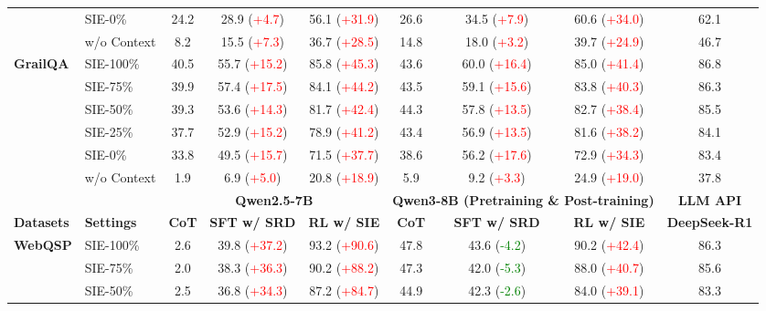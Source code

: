 \documentclass{article} %
\begin{document}
\begin{table}[t]
{\begin{tabular}{l|l|ccc|ccc|c}
& SIE-0\% & 24.2 & 28.9 (\textcolor{red}{+4.7}) & 56.1 (\textcolor{red}{+31.9}) & 26.6 & 34.5 (\textcolor{red}{+7.9}) & 60.6 (\textcolor{red}{+34.0}) & 62.1 \\
& w/o Context & 8.2 & 15.5 (\textcolor{red}{+7.3}) & 36.7 (\textcolor{red}{+28.5}) & 14.8 & 18.0 (\textcolor{red}{+3.2}) & 39.7 (\textcolor{red}{+24.9}) & 46.7 \\
\hline
\multirow{6}{*}{\textbf{GrailQA}} 
& SIE-100\% & 40.5 & 55.7 (\textcolor{red}{+15.2}) & 85.8 (\textcolor{red}{+45.3}) & 43.6 & 60.0 (\textcolor{red}{+16.4}) & 85.0 (\textcolor{red}{+41.4}) & 86.8 \\
& SIE-75\% & 39.9 & 57.4 (\textcolor{red}{+17.5}) & 84.1 (\textcolor{red}{+44.2}) & 43.5 & 59.1 (\textcolor{red}{+15.6}) & 83.8 (\textcolor{red}{+40.3}) & 86.3 \\
& SIE-50\% & 39.3 & 53.6 (\textcolor{red}{+14.3}) & 81.7 (\textcolor{red}{+42.4}) & 44.3 & 57.8 (\textcolor{red}{+13.5}) & 82.7 (\textcolor{red}{+38.4}) & 85.5 \\
& SIE-25\% & 37.7 & 52.9 (\textcolor{red}{+15.2}) & 78.9 (\textcolor{red}{+41.2}) & 43.4 & 56.9 (\textcolor{red}{+13.5}) & 81.6 (\textcolor{red}{+38.2}) & 84.1 \\
& SIE-0\% & 33.8 & 49.5 (\textcolor{red}{+15.7}) & 71.5 (\textcolor{red}{+37.7}) & 38.6 & 56.2 (\textcolor{red}{+17.6}) & 72.9 (\textcolor{red}{+34.3}) & 83.4 \\
& w/o Context & 1.9 & 6.9 (\textcolor{red}{+5.0}) & 20.8 (\textcolor{red}{+18.9}) & 5.9 & 9.2 (\textcolor{red}{+3.3}) & 24.9 (\textcolor{red}{+19.0}) & 37.8 \\
\hline
\hline
\multicolumn{2}{c|}{\textbf{}} & \multicolumn{3}{c|}{\textbf{Qwen2.5-7B}} & \multicolumn{3}{c|}{\textbf{Qwen3-8B (Pretraining \& Post-training)}} & \textbf{LLM API} \\
\hline
\textbf{Datasets} & \textbf{Settings} & \textbf{CoT} & \textbf{SFT w/ SRD} & \textbf{RL w/ SIE} & \textbf{CoT} & \textbf{SFT w/ SRD} & \textbf{RL w/ SIE} & \textbf{DeepSeek-R1} \\
\hline
\multirow{6}{*}{\textbf{WebQSP}} 
& SIE-100\% & 2.6 & 39.8 (\textcolor{red}{+37.2}) & 93.2 (\textcolor{red}{+90.6}) & 47.8 & 43.6 (\textcolor{green}{-4.2}) & 90.2 (\textcolor{red}{+42.4}) & 86.3 \\
& SIE-75\% & 2.0 & 38.3 (\textcolor{red}{+36.3}) & 90.2 (\textcolor{red}{+88.2}) & 47.3 & 42.0 (\textcolor{green}{-5.3}) & 88.0 (\textcolor{red}{+40.7}) & 85.6 \\
& SIE-50\% & 2.5 & 36.8 (\textcolor{red}{+34.3}) & 87.2 (\textcolor{red}{+84.7}) & 44.9 & 42.3 (\textcolor{green}{-2.6}) & 84.0 (\textcolor{red}{+39.1}) & 83.3 \\

\end{tabular}}
\end{table}
\end{document}
